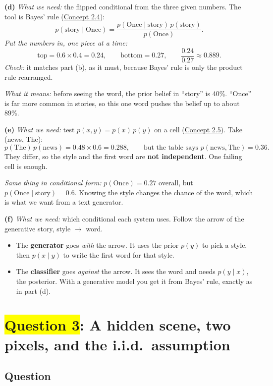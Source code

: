 \documentclass[12pt,a4paper]{article}
\begin{document}
\textbf{(d)} \emph{What we need:} the flipped conditional from the three given numbers. The tool is Bayes' rule (\hyperref[c2-4]{Concept 2.4}):
\[
p(\text{story}\mid\text{Once})=\frac{p(\text{Once}\mid\text{story})\,p(\text{story})}{p(\text{Once})} .
\]
\emph{Put the numbers in, one piece at a time:}
\[
\text{top}=0.6\times0.4=0.24,\qquad \text{bottom}=0.27,\qquad \frac{0.24}{0.27}\approx0.889 .
\]
\emph{Check:} it matches part (b), as it must, because Bayes' rule is only the product rule rearranged.

\emph{What it means:} before seeing the word, the prior belief in ``story'' is 40\%. ``Once'' is far more common in stories, so this one word pushes the belief up to about 89\%.

\textbf{(e)} \emph{What we need:} test $p(x,y)=p(x)\,p(y)$ on a cell (\hyperref[c2-5]{Concept 2.5}). Take (news, The):
\[
p(\text{The})\,p(\text{news})=0.48\times0.6=0.288,\qquad\text{but the table says }p(\text{news},\text{The})=0.36 .
\]
They differ, so the style and the first word are \textbf{not independent}. One failing cell is enough.

\emph{Same thing in conditional form:} $p(\text{Once})=0.27$ overall, but $p(\text{Once}\mid\text{story})=0.6$. Knowing the style changes the chance of the word, which is what we want from a text generator.

\textbf{(f)} \emph{What we need:} which conditional each system uses. Follow the arrow of the generative story, style $\to$ word.
\begin{itemize}[nosep]
  \item The \textbf{generator} goes \emph{with} the arrow. It uses the prior $p(y)$ to pick a style, then $p(x\mid y)$ to write the first word for that style.
  \item The \textbf{classifier} goes \emph{against} the arrow. It sees the word and needs $p(y\mid x)$, the posterior. With a generative model you get it from Bayes' rule, exactly as in part (d).
\end{itemize}
\newpage
\section{\texorpdfstring{\colorbox{yellow}{Question 3}}{Question 3}: A hidden scene, two pixels, and the i.i.d.\ assumption}

\subsection{Question}
\end{document}
